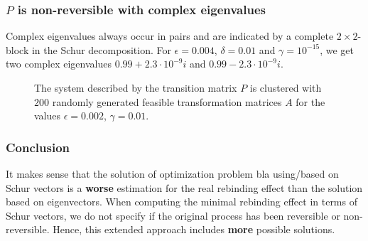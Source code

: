 \subsubsection*{$P$ is non-reversible with complex eigenvalues}

Complex eigenvalues always occur in pairs and are indicated by a complete $2 \times 2$-block in the Schur decomposition. For $\epsilon = 0.004$, $\delta = 0.01$ and $\gamma = 10^{-15}$, we get two complex eigenvalues $0.99+2.3 \cdot 10^{-9}i$ and $0.99-2.3 \cdot 10^{-9}i$.
\begin{figure}[h]
	\centering
	\hspace{1pt}
	\hspace{1pt}
	\caption{The system described by the transition matrix $P$ is clustered with $200$ randomly generated feasible transformation matrices $A$ for the values $\epsilon = 0.002$, $\gamma = 0.01$.} %
\end{figure}

%

\subsubsection*{Conclusion}

It makes sense that the solution of optimization problem bla using/based on Schur vectors is a \textbf{worse} estimation for the real rebinding effect than the solution based on eigenvectors.
When computing the minimal rebinding effect in terms of Schur vectors, we do not specify if the original process has been reversible or non-reversible.
Hence, this extended approach includes \textbf{more} possible solutions.
\clearpage

